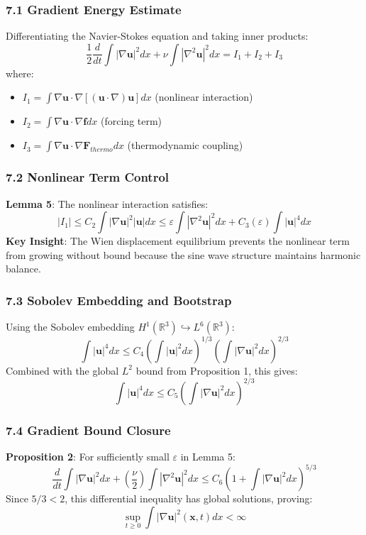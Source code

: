 ﻿\documentclass[12pt]{article}
\begin{document}
\subsubsection{7.1 Gradient Energy Estimate}
Differentiating the Navier-Stokes equation and taking inner products:
$$\frac{1}{2}\frac{d}{dt} \int|\nabla\mathbf{u}|^2 dx + \nu\int|\nabla^2\mathbf{u}|^2 dx = I_1 + I_2 + I_3$$
where:
\begin{itemize}
   \item $I_1 = \int\nabla\mathbf{u}\cdot\nabla[(\mathbf{u}\cdot\nabla)\mathbf{u}] dx$ (nonlinear interaction)
   \item $I_2 = \int\nabla\mathbf{u}\cdot\nabla\mathbf{f} dx$ (forcing term)
   \item $I_3 = \int\nabla\mathbf{u}\cdot\nabla\mathbf{F}_{thermo} dx$ (thermodynamic coupling)
\end{itemize}

\subsubsection{7.2 Nonlinear Term Control}
\textbf{Lemma 5}: The nonlinear interaction satisfies:
$$|I_1| \le C_2\int|\nabla\mathbf{u}|^2|\mathbf{u}| dx \le \varepsilon\int|\nabla^2\mathbf{u}|^2 dx + C_3(\varepsilon)\int|\mathbf{u}|^4 dx$$
\textbf{Key Insight}: The Wien displacement equilibrium prevents the nonlinear term from growing without bound because the sine wave structure maintains harmonic balance.

\subsubsection{7.3 Sobolev Embedding and Bootstrap}
Using the Sobolev embedding $H^1(\mathbb{R}^3) \hookrightarrow L^6(\mathbb{R}^3)$:
$$\int|\mathbf{u}|^4 dx \le C_4\left(\int|\mathbf{u}|^2 dx\right)^{1/3}\left(\int|\nabla\mathbf{u}|^2 dx\right)^{2/3}$$
Combined with the global $L^2$ bound from Proposition 1, this gives:
$$\int|\mathbf{u}|^4 dx \le C_5\left(\int|\nabla\mathbf{u}|^2 dx\right)^{2/3}$$

\subsubsection{7.4 Gradient Bound Closure}
\textbf{Proposition 2}: For sufficiently small $\varepsilon$ in Lemma 5:
$$\frac{d}{dt} \int|\nabla\mathbf{u}|^2 dx + \left(\frac{\nu}{2}\right)\int|\nabla^2\mathbf{u}|^2 dx \le C_6\left(1 + \int|\nabla\mathbf{u}|^2 dx\right)^{5/3}$$
Since $5/3 < 2$, this differential inequality has global solutions, proving:
$$\sup_{t\ge0} \int|\nabla\mathbf{u}|^2(\mathbf{x},t) dx < \infty$$
\end{document}
